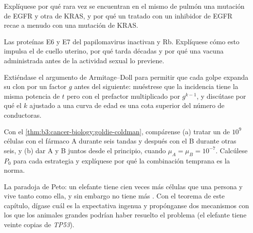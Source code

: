 \begin{exercise}[$\star\star$]\label{exo:b3:cancer-biology:8}
Explíquese por qué rara vez se encuentran en el mismo  de pulmón una
mutación de EGFR y otra de KRAS, y por qué un  tratado con un
inhibidor de EGFR recae a menudo con una mutación de KRAS.
\end{exercise}

\begin{exercise}[$\star\star$]\label{exo:b3:cancer-biology:9}
Las proteínas E6 y E7 del papilomavirus inactivan  y Rb. Explíquese
cómo esto impulsa el  de cuello uterino, por qué tarda décadas y
por qué una vacuna administrada antes de la actividad sexual lo previene.
\end{exercise}

\begin{exercise}[$\star\star\star$]\label{exo:b3:cancer-biology:10}
Extiéndase el argumento de Armitage--Doll para permitir que cada golpe
expanda su clon por un factor $g$ antes del siguiente: muéstrese que la
incidencia tiene la misma potencia de $t$ pero con el prefactor
multiplicado por $g^{k-1}$, y discútase por qué el $k$ ajustado a una
curva de edad es una cota superior del número de conductoras.
\end{exercise}

\begin{exercise}[$\star\star\star$]\label{exo:b3:cancer-biology:11}
Con el \cref{thm:b3:cancer-biology:goldie-coldman}, compárense (a) tratar
un  de $10^{9}$ células con el fármaco A durante seis tandas y
después con el B durante otras seis, y (b) dar A y B juntos desde el
principio, cuando $\mu_{A} =
\mu_{B} = 10^{-7}$. Calcúlese $P_{0}$ para cada estrategia y explíquese
por qué la combinación temprana es la norma.
\end{exercise}

\begin{exercise}[$\star\star\star$]\label{exo:b3:cancer-biology:12}
La paradoja de Peto: un elefante tiene cien veces más células que una
persona y vive tanto como ella, y sin embargo no tiene más . Con el
teorema de este capítulo, dígase cuál es la expectativa ingenua y
propónganse dos mecanismos con los que los animales grandes podrían haber
resuelto el problema (el elefante tiene veinte copias de \emph{TP53}).
\end{exercise}

